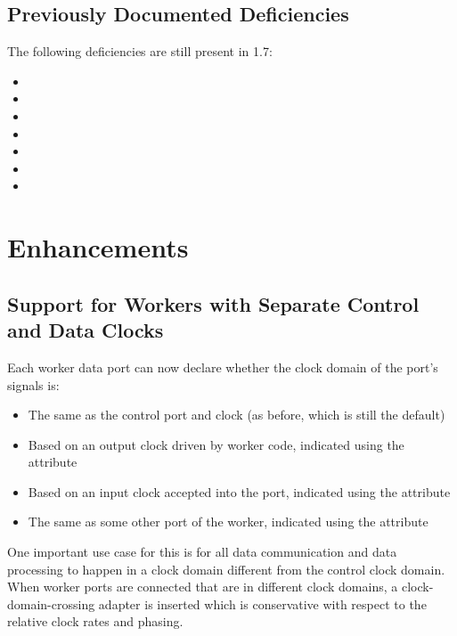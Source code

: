 \subsection{Previously Documented Deficiencies}
The following deficiencies are still present in 1.7:
\begin{itemize}
\setlength\itemsep{0em} %
\item {}
\item {}
\item {}
\item {}
\item {}
\item {}
\item {}
\end{itemize}


\def\ocpiversion{v1.6.2}  %
\section{Enhancements}
\subsection{Support for Workers with Separate Control and Data Clocks} %
\label{sec:16_clocks}
Each worker data port can now declare whether the clock domain of the port's signals is:
\begin{itemize}
\setlength\itemsep{0em} %
\item The same as the control port and clock (as before, which is still the default)
\item Based on an output clock driven by worker code, indicated using the  attribute
\item Based on an input clock accepted into the port, indicated using the  attribute
\item The same as some other port of the worker, indicated using the  attribute
\end{itemize}
One important use case for this is for all data communication and data processing to happen in a clock domain
different from the control clock domain.
When worker ports are connected that are in different clock domains, a clock-domain-crossing adapter is inserted which is conservative with respect to the relative clock rates and phasing.

